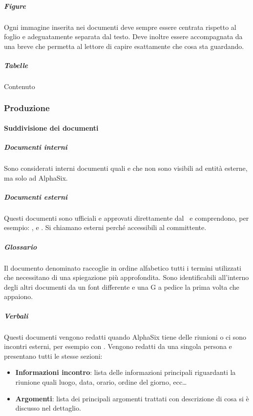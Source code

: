 			\subparagraph{Figure}
			Ogni immagine inserita nei documenti deve sempre essere centrata rispetto al foglio e adeguatamente separata dal testo. Deve inoltre essere
			accompagnata da una breve  che permetta al lettore di capire esattamente che cosa sta guardando.

			\subparagraph{Tabelle}
			Contenuto


		\subsubsection{Produzione}

			\paragraph{Suddivisione dei documenti}

			\subparagraph{Documenti interni}
			Sono considerati interni documenti quali  e  che non sono visibili ad entità esterne,
			ma solo ad AlphaSix.

			\subparagraph{Documenti esterni}
			Questi documenti sono ufficiali e approvati direttamente dal \Res\ e comprendono, per esempio: ,
			 e . Si chiamano esterni perché accessibili al committente.

			\subparagraph{Glossario}
			Il documento denominato  raccoglie in ordine alfabetico tutti i termini utilizzati che necessitano di una spiegazione più approfondita.
			Sono identificabili all'interno degli altri documenti da un font differente e una G a pedice la prima volta che appaiono.

			\subparagraph{Verbali}
			Questi documenti vengono redatti quando AlphaSix tiene delle riunioni o ci sono incontri esterni, per esempio con \II. Vengono redatti da una singola persona
			e presentano tutti le stesse sezioni:
			\begin{itemize}
				\item \textbf{Informazioni incontro}: lista delle informazioni principali riguardanti la riunione quali luogo, data, orario, ordine del giorno, ecc\dots
				\item \textbf{Argomenti}: lista dei principali argomenti trattati con descrizione di cosa si è discusso nel dettaglio.
			\end{itemize}


